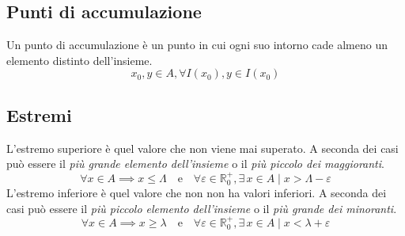 \subsection{Punti di accumulazione}
Un punto di accumulazione è un punto in cui ogni suo intorno cade almeno un elemento distinto 
dell'insieme.
\begin{equation*}
x_0,y\in A,\forall I(x_0), y\in I(x_0)
\end{equation*}

\subsection{Estremi}
L'estremo superiore è quel valore che non viene mai superato. A seconda dei casi può essere il 
\emph{più grande elemento dell'insieme} o il \emph{più piccolo dei maggioranti}.
\begin{equation*}
\forall x\in A\implies x\leq\Lambda\quad\text{e}\quad \forall\varepsilon\in\mathbb{R}_0^+,
\exists\,x\in A\mid x>\Lambda-\varepsilon
\end{equation*}
L'estremo inferiore è quel valore che non non ha valori inferiori. A seconda dei casi può essere il
\emph{più piccolo elemento dell'insieme} o il \emph{più grande dei minoranti}.
\begin{equation*}
\forall x\in A\implies x\geq\lambda\quad\text{e}\quad \forall\varepsilon\in\mathbb{R}_0^+,
\exists\,x\in A\mid x<\lambda+\varepsilon
\end{equation*}